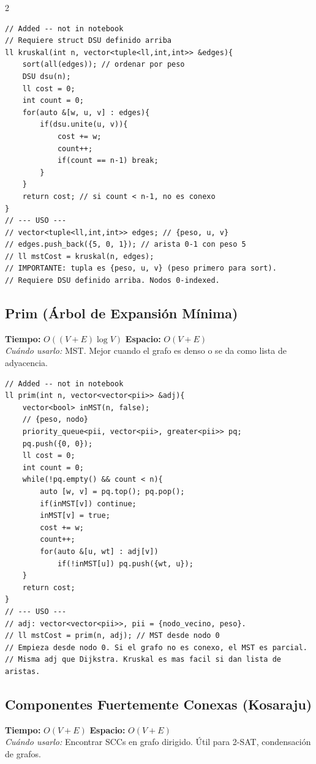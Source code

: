 \documentclass[10pt,a4paper]{article}
\begin{document}
\begin{multicols}{2}
\begin{lstlisting}
// Added -- not in notebook
// Requiere struct DSU definido arriba
ll kruskal(int n, vector<tuple<ll,int,int>> &edges){
    sort(all(edges)); // ordenar por peso
    DSU dsu(n);
    ll cost = 0;
    int count = 0;
    for(auto &[w, u, v] : edges){
        if(dsu.unite(u, v)){
            cost += w;
            count++;
            if(count == n-1) break;
        }
    }
    return cost; // si count < n-1, no es conexo
}
// --- USO ---
// vector<tuple<ll,int,int>> edges; // {peso, u, v}
// edges.push_back({5, 0, 1}); // arista 0-1 con peso 5
// ll mstCost = kruskal(n, edges);
// IMPORTANTE: tupla es {peso, u, v} (peso primero para sort).
// Requiere DSU definido arriba. Nodos 0-indexed.
\end{lstlisting}

\subsection{Prim (\'Arbol de Expansi\'on M\'inima)}
\textbf{Tiempo:} $O((V + E) \log V)$ \quad \textbf{Espacio:} $O(V + E)$\\
\textit{Cu\'ando usarlo:} MST. Mejor cuando el grafo es denso o se da como lista de adyacencia.

\begin{lstlisting}
// Added -- not in notebook
ll prim(int n, vector<vector<pii>> &adj){
    vector<bool> inMST(n, false);
    // {peso, nodo}
    priority_queue<pii, vector<pii>, greater<pii>> pq;
    pq.push({0, 0});
    ll cost = 0;
    int count = 0;
    while(!pq.empty() && count < n){
        auto [w, v] = pq.top(); pq.pop();
        if(inMST[v]) continue;
        inMST[v] = true;
        cost += w;
        count++;
        for(auto &[u, wt] : adj[v])
            if(!inMST[u]) pq.push({wt, u});
    }
    return cost;
}
// --- USO ---
// adj: vector<vector<pii>>, pii = {nodo_vecino, peso}.
// ll mstCost = prim(n, adj); // MST desde nodo 0
// Empieza desde nodo 0. Si el grafo no es conexo, el MST es parcial.
// Misma adj que Dijkstra. Kruskal es mas facil si dan lista de aristas.
\end{lstlisting}

\subsection{Componentes Fuertemente Conexas (Kosaraju)}
\textbf{Tiempo:} $O(V + E)$ \quad \textbf{Espacio:} $O(V + E)$\\
\textit{Cu\'ando usarlo:} Encontrar SCCs en grafo dirigido. \'Util para 2-SAT, condensaci\'on de grafos.


\end{multicols}
\end{document}
